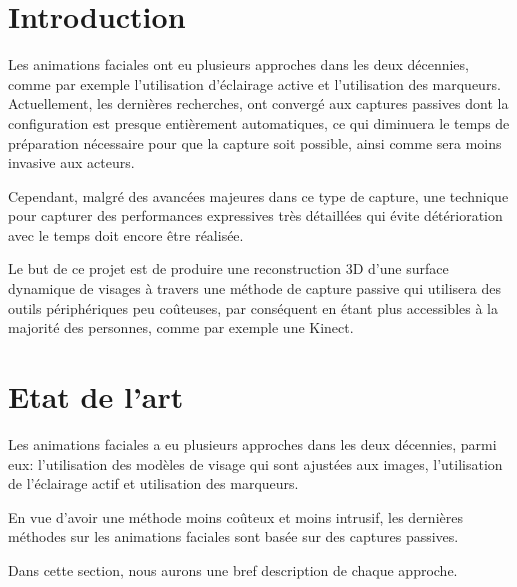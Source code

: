 \documentclass[a4paper,12pt]{article}
\begin{document}
\newpage
\thispagestyle{empty}
\tableofcontents
\newpage
\setcounter{page}{1}

\section{Introduction}

Les animations faciales ont eu plusieurs approches dans les deux
décennies, comme par exemple l'utilisation d'éclairage active et
l'utilisation des marqueurs. Actuellement, les dernières recherches,
ont convergé aux captures passives dont la configuration est presque
entièrement automatiques, ce qui diminuera le temps de préparation
nécessaire pour que la capture soit possible, ainsi comme sera moins invasive aux
acteurs.

Cependant, malgré des avancées majeures dans ce type de capture, une
technique pour capturer des performances expressives très détaillées
qui évite détérioration avec le temps doit encore être réalisée.

Le but de ce projet est de produire une reconstruction 3D d'une
surface dynamique de visages à travers une méthode de capture passive
qui utilisera des outils périphériques peu coûteuses, par conséquent
en étant plus accessibles à la majorité des personnes, comme par
exemple une Kinect.



\section{Etat de l'art}

Les animations faciales a eu plusieurs approches dans les deux décennies, 
parmi eux: l'utilisation des modèles de visage qui sont ajustées aux images, 
l'utilisation de l'éclairage actif et utilisation des marqueurs.

En vue d'avoir une méthode moins coûteux et moins intrusif, les dernières
méthodes sur les animations faciales sont basée sur des captures passives.


Dans cette section, nous aurons une bref description de chaque
approche.
\end{document}
